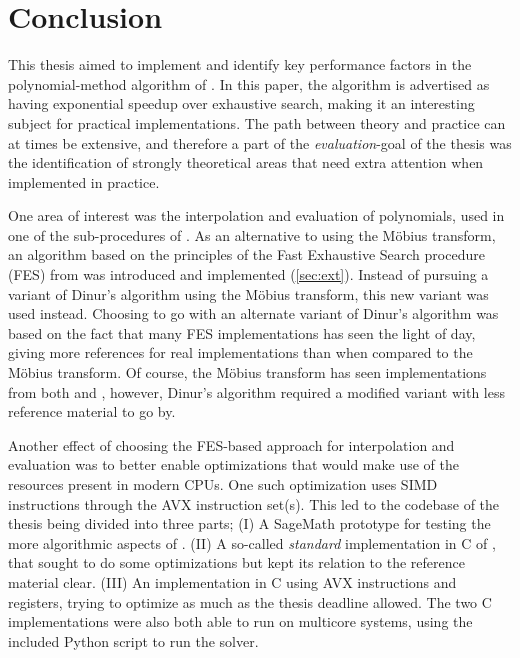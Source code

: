 \section{Conclusion} \label{sec:concl}

This thesis aimed to implement and identify key performance factors in the polynomial-method algorithm of \cite{eurocrypt-2021-30841}. In this paper, the algorithm is advertised as having exponential speedup over exhaustive search, making it an interesting subject for practical implementations. The path between theory and practice can at times be extensive, and therefore a part of the \textit{evaluation}-goal of the thesis was the identification of strongly theoretical areas that need extra attention when implemented in practice.

One area of interest was the interpolation and evaluation of polynomials, used in one of the sub-procedures of \cite{eurocrypt-2021-30841}. As an alternative to using the Möbius transform, an algorithm based on the principles of the Fast Exhaustive Search procedure (FES) from \cite{ches-2010-23990} was introduced and implemented (\cref{sec:ext}). Instead of pursuing a variant of Dinur's algorithm using the Möbius transform, this new variant was used instead. Choosing to go with an alternate variant of Dinur's algorithm was based on the fact that many FES implementations has seen the light of day, giving more references for real implementations than when compared to the Möbius transform. Of course, the Möbius transform has seen implementations from both \cite{cryptoeprint:2022/1412} and \cite{joux2009algorithmic}, however, Dinur's algorithm required a modified variant with less reference material to go by.

Another effect of choosing the FES-based approach for interpolation and evaluation was to better enable optimizations that would make use of the resources present in modern CPUs. One such optimization uses SIMD instructions through the AVX instruction set(s). This led to the codebase of the thesis being divided into three parts; (I) A SageMath prototype for testing the more algorithmic aspects of \cite{eurocrypt-2021-30841}. (II) A so-called \textit{standard} implementation in C of \cite{eurocrypt-2021-30841}, that sought to do some optimizations but kept its relation to the reference material clear. (III) An implementation in C using AVX instructions and registers, trying to optimize as much as the thesis deadline allowed. The two C implementations were also both able to run on multicore systems, using the included Python script to run the solver.

